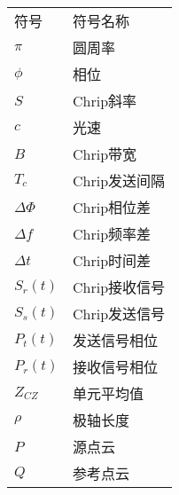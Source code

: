 \begin{center}
    {
    \renewcommand{\arraystretch}{1.28}
    \begin{tabular}{p{4cm}l}
        符号 & 符号名称 \\
        $\pi$ & 圆周率 \\
        $\phi$ & 相位 \\
        $S$ & Chrip斜率\\
        $c$ & 光速 \\
        $B$ & Chrip带宽 \\
        $T_c$ & Chrip发送间隔 \\
        $\Delta\Phi$ & Chrip相位差 \\
        $\Delta f$ & Chrip频率差 \\
        $\Delta t$ & Chrip时间差 \\
        $S_r(t)$ & Chrip接收信号 \\
        $S_s(t)$ & Chrip发送信号 \\
        $P_t(t)$ & 发送信号相位 \\
        $P_r(t)$ & 接收信号相位 \\
        $Z_{CZ}$ & 单元平均值 \\
        $\rho$&  极轴长度\\
        $P$ & 源点云 \\
        $Q$&  参考点云\\
    \end{tabular}
    }

\end{center}

